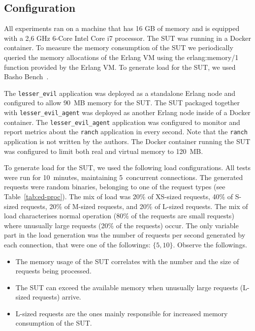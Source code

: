 \documentclass{llncs}
\begin{document}
\subsection{Configuration}

All experiments ran on a machine that has 16 GB of memory and is equipped with a 2,6 GHz 6-Core Intel Core i7  processor. The SUT was running in a Docker container. To measure the memory consumption of the SUT we periodically queried the memory allocations of the Erlang VM using the erlang:memory/1 function provided by the Erlang VM. To generate load for the SUT, we used Basho Bench~\cite{loadgen}.

The \verb+lesser_evil+ application was deployed as a standalone Erlang node and configured to allow 90~MB memory for the SUT. The SUT packaged together with \verb+lesser_evil_agent+ was deployed as another Erlang node inside of a Docker container.  The \verb+lesser_evil_agent+  application was configured to monitor and report metrics about the \verb+ranch+ application in every second. Note that the \verb+ranch+ application is not written by the authors. The Docker container running the SUT was configured to limit both real and virtual memory to 120~MB.

To generate load for the SUT, we used the following load configurations. All tests were run for 10~minutes, maintaining 5~concurrent connections. The generated requests were random binaries, belonging to one of the request types (see Table~\ref{tab:ed-proc}). The mix of load was 20\% of XS-sized requests, 40\% of S-sized requests, 20\% of M-sized requests, and 20\% of L-sized requests. The mix of load characterises normal operation (80\% of the requests are small requests) where unusually large requests (20\% of the requests) occur. The only variable part in the load generation was the number of requests per second generated by each connection, that were one of the followings: $\{5,10\}$.
Observe the followings.
\begin{itemize}
\item The memory usage of the SUT correlates with the number and the size of requests being processed. 
\item The SUT can exceed the available memory when unusually large requests (L-sized requests) arrive.
\item L-sized requests are the ones mainly responsible for increased memory consumption of the SUT.
\end{itemize}
\end{document}
